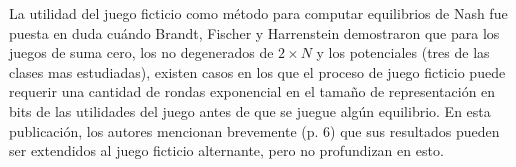 La utilidad del juego ficticio como método para computar equilibrios de Nash fue puesta en duda cuándo Brandt, Fischer y Harrenstein \cite{brandt:rate:convergence} demostraron que para los juegos de suma cero, los no degenerados de $2 \times N$ y los potenciales (tres de las clases mas estudiadas), existen casos en los que el proceso de juego ficticio puede requerir una cantidad de rondas exponencial en el tamaño de representación en bits de las utilidades del juego antes de que se juegue algún equilibrio. En esta publicación, los autores mencionan brevemente (p. 6) que sus resultados pueden ser extendidos al juego ficticio alternante, pero no profundizan en esto. 
